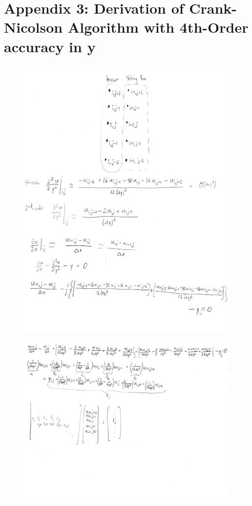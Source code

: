 \documentclass[10pt]{article}
\begin{document}
\section*{Appendix 3: Derivation of Crank-Nicolson Algorithm with 4th-Order accuracy in y}
\begin{figure}[H]
	\begin{center}
		\includegraphics[width=16cm]{app3_p1.jpg}
	\end{center}
\end{figure}
\pagebreak
\begin{figure}[H]
	\begin{center}
		\includegraphics[width=16cm]{app3_p2.jpg}
	\end{center}
\end{figure}
\end{document}
